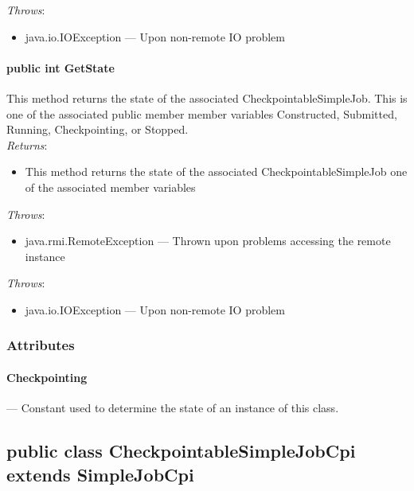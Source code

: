 \documentclass[$Date: 2003/06/26 19:29:31 $]{glabarticle}
\begin{document}
\textit{Throws}:
\begin{itemize}
\item[] java.io.IOException --- Upon non-remote IO problem 
\end{itemize} 

\paragraph{public int GetState}

This method returns the state of the associated
CheckpointableSimpleJob. This is one of the associated public member
member variables Constructed, Submitted, Running,
Checkpointing, or Stopped. \\

 \textit{Returns}:
 \begin{itemize}
 \item[] This method returns the state of the associated CheckpointableSimpleJob one of the associated member
 variables
 \end{itemize} 

 \textit{Throws}:
 \begin{itemize}
 \item[] java.rmi.RemoteException --- Thrown upon problems accessing the remote instance 
 \end{itemize}
 
\textit{Throws}:
\begin{itemize}
\item[] java.io.IOException --- Upon non-remote IO problem 
\end{itemize}


\subsubsection{Attributes}

\paragraph{Checkpointing} --- Constant used to determine the state of an instance of this class.


\newpage

\subsection{public class CheckpointableSimpleJobCpi extends SimpleJobCpi}
\end{document}
